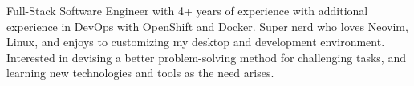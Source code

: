 

\begin{cvparagraph}

	Full-Stack Software Engineer with 4+ years of experience with additional experience in DevOps with OpenShift and Docker. Super nerd who loves Neovim, Linux, and enjoys to customizing my desktop and development environment. Interested in devising a better problem-solving method for challenging tasks, and learning new technologies and tools as the need arises.
\end{cvparagraph}
